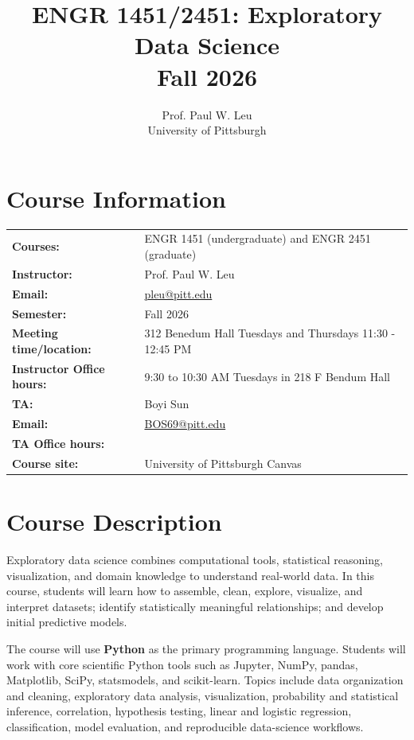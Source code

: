\documentclass[11pt]{article}
\title{\textbf{ENGR 1451/2451: Exploratory Data Science}\\
Fall 2026}
\author{Prof. Paul W. Leu\\University of Pittsburgh}
\date{}
\begin{document}
\maketitle

\tableofcontents

\section{Course Information}

\begin{tabular}{@{}ll@{}}
\textbf{Courses:} & ENGR 1451 (undergraduate) and ENGR 2451 (graduate)\\
\textbf{Instructor:} & Prof. Paul W. Leu\\
\textbf{Email:} & \href{mailto:pleu@pitt.edu}{pleu@pitt.edu}\\
\textbf{Semester:} & Fall 2026\\
\textbf{Meeting time/location:} & 312 Benedum Hall Tuesdays and Thursdays 11:30 - 12:45 PM\\ 
\textbf{Instructor Office hours:} & 9:30 to 10:30 AM Tuesdays in 218 F Bendum Hall\\
\textbf{TA:} & Boyi Sun\\
\textbf{Email:} & \href{mailto:BOS69@pitt.edu}{BOS69@pitt.edu}\\
\textbf{TA Office hours:} & \\
\textbf{Course site:} & University of Pittsburgh Canvas\\
\end{tabular}

\section{Course Description}
Exploratory data science combines computational tools, statistical reasoning, visualization, and domain knowledge to understand real-world data. In this course, students will learn how to assemble, clean, explore, visualize, and interpret datasets; identify statistically meaningful relationships; and develop initial predictive models.

The course will use \textbf{Python} as the primary programming language. Students will work with core scientific Python tools such as Jupyter, NumPy, pandas, Matplotlib, SciPy, statsmodels, and scikit-learn. Topics include data organization and cleaning, exploratory data analysis, visualization, probability and statistical inference, correlation, hypothesis testing, linear and logistic regression, classification, model evaluation, and reproducible data-science workflows.
\end{document}
